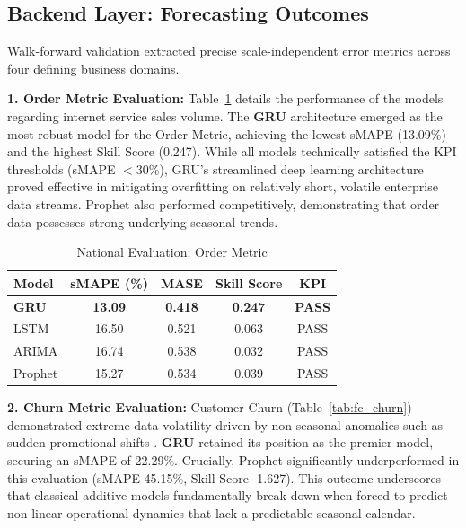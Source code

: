 \documentclass[conference]{IEEEtran}
\begin{document}
\subsection{Backend Layer: Forecasting Outcomes}
Walk-forward validation extracted precise scale-independent error metrics across four defining business domains.

\textbf{1. Order Metric Evaluation:} Table~\ref{tab:fc_order} details the performance of the models regarding internet service sales volume. The \textbf{GRU} architecture emerged as the most robust model for the Order Metric, achieving the lowest sMAPE (13.09\%) and the highest Skill Score (0.247). While all models technically satisfied the KPI thresholds (sMAPE $<30\%$), GRU's streamlined deep learning architecture proved effective in mitigating overfitting on relatively short, volatile enterprise data streams. Prophet also performed competitively, demonstrating that order data possesses strong underlying seasonal trends.

\begin{table}[htbp] \footnotesize
\caption{National Evaluation: Order Metric}
\begin{center}
\begin{tabular}{lcccc}
\toprule
\textbf{Model} & \textbf{sMAPE (\%)} & \textbf{MASE} & \textbf{Skill Score} & \textbf{KPI} \\
\midrule
\textbf{GRU} & \textbf{13.09} & \textbf{0.418} & \textbf{0.247} & \textbf{PASS} \\
LSTM & 16.50 & 0.521 & 0.063 & PASS \\
ARIMA & 16.74 & 0.538 & 0.032 & PASS \\
Prophet & 15.27 & 0.534 & 0.039 & PASS \\
\bottomrule
\end{tabular}
\label{tab:fc_order}
\end{center}

\end{table}
\vspace{-0.3cm}

\textbf{2. Churn Metric Evaluation:} Customer Churn (Table~\ref{tab:fc_churn}) demonstrated extreme data volatility driven by non-seasonal anomalies such as sudden promotional shifts \cite{Mena2023}. \textbf{GRU} retained its position as the premier model, securing an sMAPE of 22.29\%. Crucially, Prophet significantly underperformed in this evaluation (sMAPE 45.15\%, Skill Score -1.627). This outcome underscores that classical additive models fundamentally break down when forced to predict non-linear operational dynamics that lack a predictable seasonal calendar.
\end{document}
